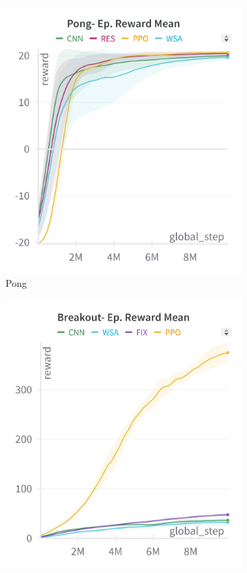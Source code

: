 \begin{figure}[htbp]
    \centering
    \begin{subfigure}[b]{0.32\textwidth}
        \centering
        \includegraphics[width=\textwidth]{images/pong_train.png}
        \caption{Pong}
        \label{fig:pongtraining}
    \end{subfigure}
    \hfill
    \begin{subfigure}[b]{0.32\textwidth}
        \centering
        \includegraphics[width=\textwidth]{images/breakout_train.png}

\end{subfigure}
\end{figure}
